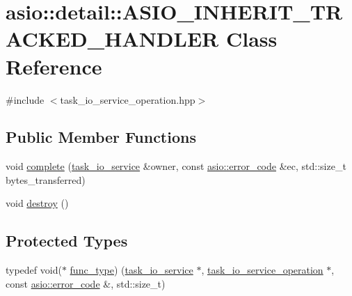 \hypertarget{classasio_1_1detail_1_1_a_s_i_o___i_n_h_e_r_i_t___t_r_a_c_k_e_d___h_a_n_d_l_e_r}{}\section{asio\+:\+:detail\+:\+:A\+S\+I\+O\+\_\+\+I\+N\+H\+E\+R\+I\+T\+\_\+\+T\+R\+A\+C\+K\+E\+D\+\_\+\+H\+A\+N\+D\+L\+E\+R Class Reference}
\label{classasio_1_1detail_1_1_a_s_i_o___i_n_h_e_r_i_t___t_r_a_c_k_e_d___h_a_n_d_l_e_r}


{\ttfamily \#include $<$task\+\_\+io\+\_\+service\+\_\+operation.\+hpp$>$}

\subsection*{Public Member Functions}
\begin{DoxyCompactItemize}
\item 
void \hyperlink{classasio_1_1detail_1_1_a_s_i_o___i_n_h_e_r_i_t___t_r_a_c_k_e_d___h_a_n_d_l_e_r_a09c3bd20d61f5b857eabe986e0e4f9fa}{complete} (\hyperlink{classasio_1_1detail_1_1task__io__service}{task\+\_\+io\+\_\+service} \&owner, const \hyperlink{classasio_1_1error__code}{asio\+::error\+\_\+code} \&ec, std\+::size\+\_\+t bytes\+\_\+transferred)
\item 
void \hyperlink{classasio_1_1detail_1_1_a_s_i_o___i_n_h_e_r_i_t___t_r_a_c_k_e_d___h_a_n_d_l_e_r_a7384f192052e719cb1f0db1a7727ae36}{destroy} ()
\end{DoxyCompactItemize}
\subsection*{Protected Types}
\begin{DoxyCompactItemize}
\item 
typedef void($\ast$ \hyperlink{classasio_1_1detail_1_1_a_s_i_o___i_n_h_e_r_i_t___t_r_a_c_k_e_d___h_a_n_d_l_e_r_a424de9363d10315aa1db285d51219500}{func\+\_\+type}) (\hyperlink{classasio_1_1detail_1_1task__io__service}{task\+\_\+io\+\_\+service} $\ast$, \hyperlink{classasio_1_1detail_1_1_a_s_i_o___i_n_h_e_r_i_t___t_r_a_c_k_e_d___h_a_n_d_l_e_r_a1e458b6f5eadbe2c7a47bfb228979f90}{task\+\_\+io\+\_\+service\+\_\+operation} $\ast$, const \hyperlink{classasio_1_1error__code}{asio\+::error\+\_\+code} \&, std\+::size\+\_\+t)
\end{DoxyCompactItemize}
